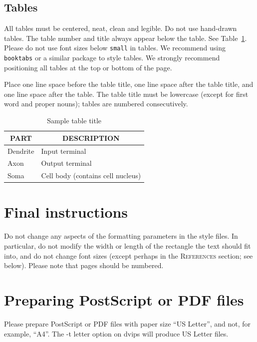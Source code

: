 \documentclass{article} %
\begin{document}
\subsection{Tables}

All tables must be centered, neat, clean and legible. Do not use hand-drawn tables. The table number and title always appear below the table. See Table~\ref{sample-table}. Please do not use font sizes below {\tt small} in tables. We recommend using {\tt booktabs} or a similar package to style tables. 
We strongly recommend positioning all tables at the top or bottom of the page.

Place one line space before the table title, one line space after the table title, and one line space after the table. The table title must be lowercase (except for first word and proper nouns); tables are numbered consecutively.

\begin{table}[t]
\begin{center}
\begin{tabular}{ll}
\toprule
\multicolumn{1}{c}{\bf PART}  &\multicolumn{1}{c}{\bf DESCRIPTION} \\
\midrule
Dendrite         &Input terminal \\
Axon             &Output terminal \\
Soma             &Cell body (contains cell nucleus) \\
\bottomrule
\end{tabular}
\end{center}
\caption{Sample table title}\label{sample-table}
\end{table}




\section{Final instructions}
Do not change any aspects of the formatting parameters in the style files.
In particular, do not modify the width or length of the rectangle the text
should fit into, and do not change font sizes (except perhaps in the
\textsc{References} section; see below). Please note that pages should be
numbered.

\section{Preparing PostScript or PDF files}

Please prepare PostScript or PDF files with paper size ``US Letter'', and
not, for example, ``A4''. The -t
letter option on dvips will produce US Letter files.
\end{document}
